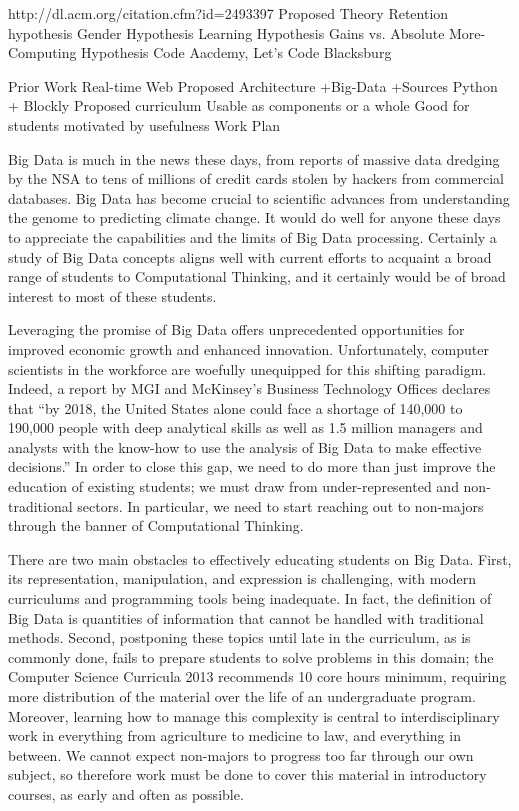 	http://dl.acm.org/citation.cfm?id=2493397
Proposed Theory
	Retention hypothesis
	Gender Hypothesis
	Learning Hypothesis
		Gains vs. Absolute
	More-Computing Hypothesis
		Code Aacdemy, Let's Code Blacksburg
	
Prior Work
	Real-time Web
Proposed Architecture
	+Big-Data
	+Sources
	Python + Blockly
Proposed curriculum
	Usable as components or a whole
	Good for students motivated by usefulness
Work Plan


Big Data is much in the news these days, from reports of massive data
dredging by the NSA to tens of millions of credit cards stolen by
hackers from commercial databases.
Big Data has become crucial to scientific advances from understanding the
genome to predicting climate change.
It would do well for anyone these days to appreciate the capabilities
and the limits of Big Data processing.
Certainly a study of Big Data concepts aligns well with current
efforts to acquaint a broad range of students to Computational
Thinking, and it certainly would be of broad interest to most of these
students.

Leveraging the promise of Big Data offers unprecedented opportunities
for improved economic growth and enhanced innovation.
Unfortunately, computer scientists in the workforce are woefully
unequipped for this shifting paradigm.
Indeed, a report by MGI and McKinsey's Business Technology Offices
declares that ``by 2018, the United States alone could face a
shortage of 140,000 to 190,000 people with deep analytical skills as
well as 1.5 million managers and analysts with the know-how to use the
analysis of Big Data to make effective decisions.''\cite{McKinsey}
In order to close this gap, we need to do more than just improve the
education of existing students; we must draw from under-represented
and non-traditional sectors.
In particular, we need to start reaching out to non-majors through the banner of Computational Thinking.

There are two main obstacles to effectively educating students on Big
Data.
First, its representation, manipulation, and expression is
challenging, with modern curriculums and programming tools being
inadequate.
In fact, the definition of Big Data is quantities of information that
cannot be handled with traditional methods\cite{McKinsey}.
Second, postponing these topics until late in the curriculum, as is
commonly done\cite{CS2013}, fails to prepare students to solve problems in this
domain; the Computer Science Curricula 2013 recommends 10 core hours
minimum, requiring more distribution of the material over the life of
an undergraduate program.
Moreover, learning how to manage this complexity is central to
interdisciplinary work in everything from agriculture to medicine to
law, and everything in between\cite{theory-end}.
We cannot expect non-majors to progress too far through our own
subject, so therefore work must be done to cover this material in
introductory courses, as early and often as possible.

